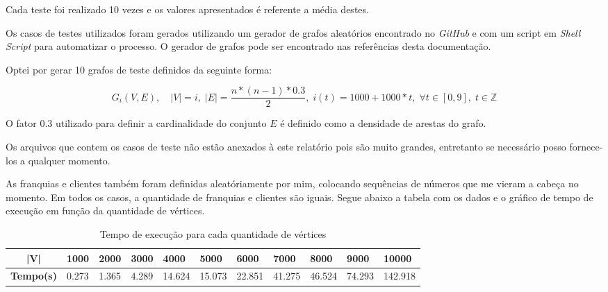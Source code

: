\documentclass[
	12pt,
	a4paper,
	onepage,
	brazil
]{article}
\theoremstyle{definition}
\begin{document}
	Cada teste foi realizado 10 vezes e os valores apresentados é referente a média destes.
	
	Os casos de testes utilizados foram gerados utilizando um gerador de grafos aleatórios encontrado no \textit{GitHub} e com um script em \textit{Shell Script} para automatizar o processo. O gerador de grafos pode ser encontrado nas referências desta documentação.
	
	Optei por gerar 10 grafos de teste definidos da seguinte forma:
	
	\begin{equation}
		G_i(V,E), \quad |V| = i,\; |E| = \frac{n*(n-1)*0.3}{2},\; i(t) = 1000 + 1000*t,\; \forall t \in [0,9],\; t \in \mathbb{Z}
	\end{equation}
	
	O fator 0.3 utilizado para definir a cardinalidade do conjunto $E$ é definido como a densidade de arestas do grafo.
	
	Os arquivos que contem os casos de teste não estão anexados à este relatório pois são muito grandes, entretanto se necessário posso fornece-los a qualquer momento.
	
	As franquias e clientes também foram definidas aleatóriamente por mim, colocando sequências de números que me vieram a cabeça no momento. Em todos os casos, a quantidade de franquias e clientes são iguais. Segue abaixo a tabela com os dados e o gráfico de tempo de execução em função da quantidade de vértices.
	
	\begin{table}[H]
		\centering
		\caption{Tempo de execução para cada quantidade de vértices}
		\label{my-label}
		\begin{tabular}{|c|l|l|l|l|l|l|l|l|l|l|}
			\hline
			\textbf{|V|}      & 1000  & 2000  & 3000  & 4000   & 5000   & 6000   & 7000   & 8000   & 9000   & 10000   \\ \hline
			\textbf{Tempo(s)} & 0.273 & 1.365 & 4.289 & 14.624 & 15.073 & 22.851 & 41.275 & 46.524 & 74.293 & 142.918 \\ \hline
		\end{tabular}
	\end{table}
	
\end{document}
